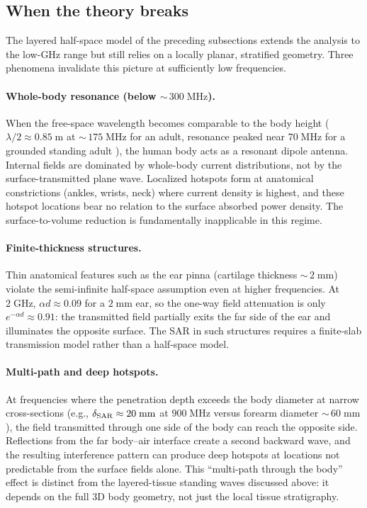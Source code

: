 \subsection{When the theory breaks}
\label{sec:limitations-low-freq}

The layered half-space model of the preceding subsections extends the
analysis to the low-GHz range but still relies on a locally planar,
stratified geometry.  Three phenomena invalidate this picture at
sufficiently low frequencies.

\paragraph{Whole-body resonance (below ${\sim}\,300\;\mathrm{MHz}$).}
When the free-space wavelength becomes comparable to the body height
($\lambda/2 \approx 0.85\;\mathrm{m}$ at ${\sim}\,175\;\mathrm{MHz}$
for an adult, resonance peaked near $70\;\mathrm{MHz}$
for a grounded standing adult \cite{Durney1986}), the human body acts as
a resonant dipole antenna.  Internal fields are dominated by whole-body
current distributions, not by the surface-transmitted plane wave.
Localized hotspots form at anatomical constrictions (ankles, wrists, neck)
where current density is highest, and these hotspot locations bear no
relation to the surface absorbed power density.  The surface-to-volume
reduction is fundamentally inapplicable in this regime.

\paragraph{Finite-thickness structures.}
Thin anatomical features such as the ear pinna (cartilage thickness
${\sim}\,2\;\mathrm{mm}$) violate the semi-infinite half-space
assumption even at higher frequencies.  At $2\;\mathrm{GHz}$,
$\alpha d \approx 0.09$ for a $2\;\mathrm{mm}$ ear, so the one-way field
attenuation is only $e^{-\alpha d} \approx 0.91$: the transmitted field
partially exits the far side of the ear and illuminates the opposite
surface.  The SAR in such structures requires a finite-slab transmission
model rather than a half-space model.

\paragraph{Multi-path and deep hotspots.}
At frequencies where the penetration depth exceeds the body diameter at
narrow cross-sections (e.g., $\delta_{\mathrm{SAR}} \approx 20\;\mathrm{mm}$ at
$900\;\mathrm{MHz}$ versus forearm diameter ${\sim}\,60\;\mathrm{mm}$),
the field transmitted through one side of the body can reach the opposite
side.  Reflections from the far body--air interface create a second
backward wave, and the resulting interference pattern can produce deep
hotspots at locations not predictable from the surface fields alone.  This
``multi-path through the body'' effect is distinct from the layered-tissue
standing waves discussed above: it depends on the full 3D body geometry,
not just the local tissue stratigraphy.


